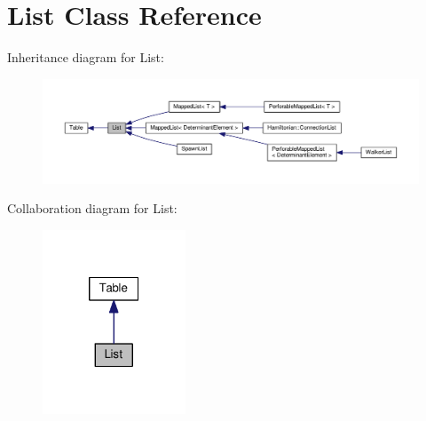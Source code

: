 \hypertarget{classList}{}\section{List Class Reference}
\label{classList}


Inheritance diagram for List\+:
\nopagebreak
\begin{figure}[H]
\begin{center}
\leavevmode
\includegraphics[width=350pt]{classList__inherit__graph}
\end{center}
\end{figure}


Collaboration diagram for List\+:
\nopagebreak
\begin{figure}[H]
\begin{center}
\leavevmode
\includegraphics[width=121pt]{classList__coll__graph}
\end{center}
\end{figure}
